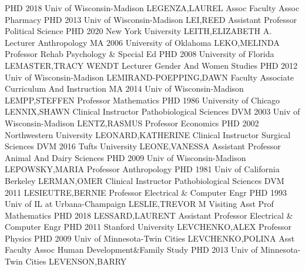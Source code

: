 \documentclass[
]{article}
\begin{document}
\textbar PHD 2018 Univ of Wisconsin-Madison \textbar LEGENZA,LAUREL
\textbar{}  \textbar Assoc Faculty Assoc \textbar Pharmacy
\textbar PHD 2013 Univ of Wisconsin-Madison \textbar LEI,REED \textbar{}
 \textbar Assistant Professor \textbar Political Science
\textbar PHD 2020 New York University \textbar LEITH,ELIZABETH A.
\textbar{}  \textbar Lecturer \textbar Anthropology
\textbar MA 2006 University of Oklahoma \textbar LEKO,MELINDA \textbar{}
 \textbar Professor \textbar Rehab Psychology \& Special Ed
\textbar PHD 2008 University of Florida \textbar LEMASTER,TRACY WENDT
\textbar{}  \textbar Lecturer \textbar Gender And Women
Studies \textbar PHD 2012 Univ of Wisconsin-Madison
\textbar LEMIRAND-POEPPING,DAWN \textbar{}  \textbar Faculty
Associate \textbar Curriculum And Instruction \textbar MA 2014 Univ of
Wisconsin-Madison \textbar LEMPP,STEFFEN \textbar{} 
\textbar Professor \textbar Mathematics \textbar PHD 1986 University of
Chicago \textbar LENNIX,SHAWN \textbar{}  \textbar Clinical
Instructor \textbar Pathobiological Sciences \textbar DVM 2003 Univ of
Wisconsin-Madison \textbar LENTZ,RASMUS \textbar{} 
\textbar Professor \textbar Economics \textbar PHD 2002 Northwestern
University \textbar LEONARD,KATHERINE \textbar{} 
\textbar Clinical Instructor \textbar Surgical Sciences \textbar DVM
2016 Tufts University \textbar LEONE,VANESSA \textbar{} 
\textbar Assistant Professor \textbar Animal And Dairy Sciences
\textbar PHD 2009 Univ of Wisconsin-Madison \textbar LEPOWSKY,MARIA
\textbar{}  \textbar Professor \textbar Anthropology
\textbar PHD 1981 Univ of California Berkeley \textbar LERMAN,OMER
\textbar{}  \textbar Clinical Instructor
\textbar Pathobiological Sciences \textbar DVM 2011
\textbar LESIEUTRE,BERNIE \textbar{}  \textbar Professor
\textbar Electrical \& Computer Engr \textbar PHD 1993 Univ of IL at
Urbana-Champaign \textbar LESLIE,TREVOR M \textbar{} 
\textbar Visiting Asst Prof \textbar Mathematics \textbar PHD 2018
\textbar LESSARD,LAURENT \textbar{}  \textbar Assistant
Professor \textbar Electrical \& Computer Engr \textbar PHD 2011
Stanford University \textbar LEVCHENKO,ALEX \textbar{} 
\textbar Professor \textbar Physics \textbar PHD 2009 Univ of
Minnesota-Twin Cities \textbar LEVCHENKO,POLINA \textbar{} 
\textbar Asst Faculty Assoc \textbar Human Development\&Family Study
\textbar PHD 2013 Univ of Minnesota-Twin Cities \textbar LEVENSON,BARRY
\end{document}
